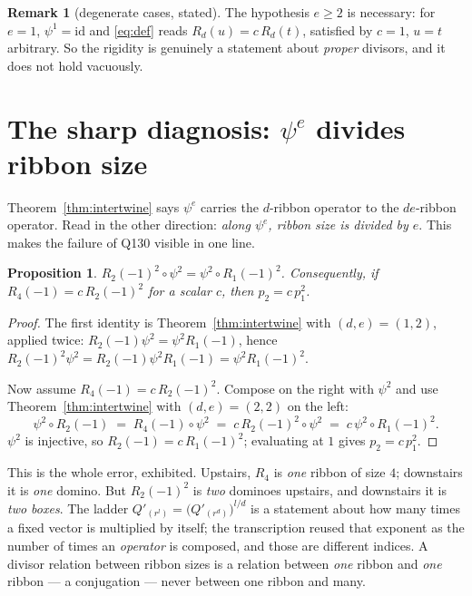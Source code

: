 \documentclass[11pt]{article}
\newtheorem{proposition}[theorem]{Proposition}
\theoremstyle{definition}
\newtheorem{remark}[theorem]{Remark}
\begin{document}
\begin{remark}[degenerate cases, stated]
The hypothesis $e\ge2$ is necessary: for $e=1$, $\psi^{1}=\mathrm{id}$ and \eqref{eq:def}
reads $R_d(u)=c\,R_d(t)$, satisfied by $c=1$, $u=t$ arbitrary.  So the rigidity is genuinely
a statement about \emph{proper} divisors, and it does not hold vacuously.
\end{remark}

\section{The sharp diagnosis: $\psi^{e}$ divides ribbon size}\label{sec:descent}

Theorem~\ref{thm:intertwine} says $\psi^{e}$ carries the $d$-ribbon operator to the
$de$-ribbon operator.  Read in the other direction: \emph{along $\psi^{e}$, ribbon size is
divided by $e$}.  This makes the failure of Q130 visible in one line.

\begin{proposition}\label{prop:descent}
$R_2(-1)^{2}\circ\psi^{2}=\psi^{2}\circ R_1(-1)^{2}$.  Consequently, if
$R_4(-1)=c\,R_2(-1)^{2}$ for a scalar $c$, then $p_2=c\,p_1^{2}$.
\end{proposition}

\begin{proof}
The first identity is Theorem~\ref{thm:intertwine} with $(d,e)=(1,2)$, applied twice:
$R_2(-1)\psi^{2}=\psi^{2}R_1(-1)$, hence
$R_2(-1)^{2}\psi^{2}=R_2(-1)\psi^{2}R_1(-1)=\psi^{2}R_1(-1)^{2}$.

Now assume $R_4(-1)=c\,R_2(-1)^2$.  Compose on the right with $\psi^{2}$ and use
Theorem~\ref{thm:intertwine} with $(d,e)=(2,2)$ on the left:
\[
  \psi^{2}\circ R_2(-1)\;=\;R_4(-1)\circ\psi^{2}\;=\;c\,R_2(-1)^{2}\circ\psi^{2}
  \;=\;c\,\psi^{2}\circ R_1(-1)^{2}.
\]
$\psi^{2}$ is injective, so $R_2(-1)=c\,R_1(-1)^{2}$; evaluating at $1$ gives
$p_2=c\,p_1^{2}$.
\end{proof}

This is the whole error, exhibited.  Upstairs, $R_4$ is \emph{one} ribbon of size $4$;
downstairs it is \emph{one} domino.  But $R_2(-1)^2$ is \emph{two} dominoes upstairs, and
downstairs it is \emph{two boxes}.  The ladder $Q'_{(r^{l})}=\bigl(Q'_{(r^{d})}\bigr)^{l/d}$
is a statement about how many times a fixed vector is multiplied by itself; the
transcription reused that exponent as the number of times an \emph{operator} is composed,
and those are different indices.  A divisor relation between ribbon sizes is a relation
between \emph{one} ribbon and \emph{one} ribbon --- a conjugation --- never between one
ribbon and many.
\end{document}
